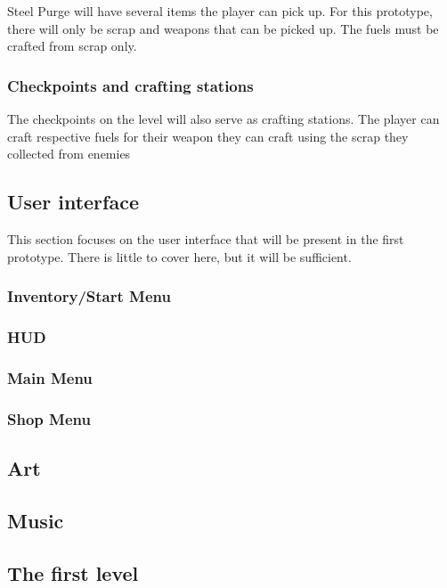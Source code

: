 \documentclass[../Main.tex]{subfiles}
\begin{document}
Steel Purge will have several items the player can pick up. For this prototype, there will only be scrap and weapons that can be picked up. The fuels must be crafted from scrap only.

\subsubsection{Checkpoints and crafting stations}

The checkpoints on the level will also serve as crafting stations. The player can craft respective fuels for their weapon they can craft using the scrap they collected from enemies

\subsection{User interface}

This section focuses on the user interface that will be present in the first prototype. There is little to cover here, but it will be sufficient. 

\subsubsection{Inventory/Start Menu}
\subsubsection{HUD}
\subsubsection{Main Menu}
\subsubsection{Shop Menu}

\subsection{Art}

\subsection{Music}

\subsection{The first level}
\end{document}
